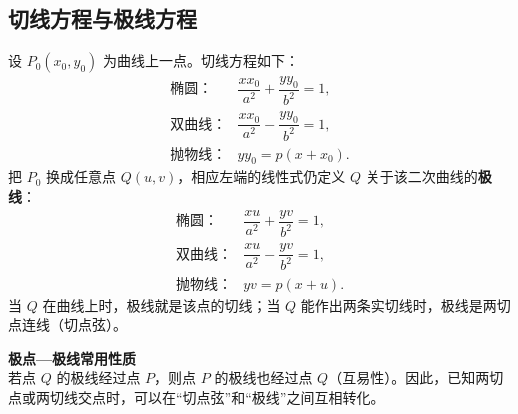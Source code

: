 \documentclass[UTF8,zihao=-4,a4paper]{ctexart}
\begin{document}
\subsection{切线方程与极线方程}

设 $P_0(x_0,y_0)$ 为曲线上一点。切线方程如下：
\[
\begin{array}{ll}
\text{椭圆：}&\boxed{\dfrac{xx_0}{a^2}+\dfrac{yy_0}{b^2}=1},\\[0.8em]
\text{双曲线：}&\boxed{\dfrac{xx_0}{a^2}-\dfrac{yy_0}{b^2}=1},\\[0.8em]
\text{抛物线：}&\boxed{yy_0=p(x+x_0)}.
\end{array}
\]
把 $P_0$ 换成任意点 $Q(u,v)$，相应左端的线性式仍定义 $Q$ 关于该二次曲线的\textbf{极线}：
\[
\begin{array}{ll}
\text{椭圆：}&\dfrac{xu}{a^2}+\dfrac{yv}{b^2}=1,\\[0.5em]
\text{双曲线：}&\dfrac{xu}{a^2}-\dfrac{yv}{b^2}=1,\\[0.5em]
\text{抛物线：}&yv=p(x+u).
\end{array}
\]
当 $Q$ 在曲线上时，极线就是该点的切线；当 $Q$ 能作出两条实切线时，极线是两切点连线（切点弦）。

\begin{keybox}
\textbf{极点—极线常用性质}\\
若点 $Q$ 的极线经过点 $P$，则点 $P$ 的极线也经过点 $Q$（互易性）。因此，已知两切点或两切线交点时，可以在“切点弦”和“极线”之间互相转化。
\end{keybox}
\end{document}

